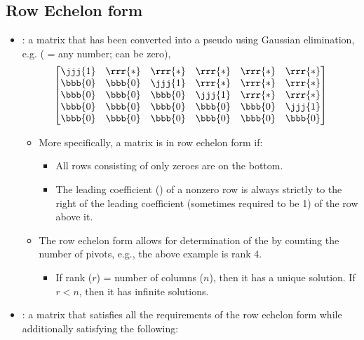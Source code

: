 \begin{itemize}
  \subsection{Row Echelon form}\label{Row Echelon form}
  \begin{itemize}
    \item {}: a matrix that has been converted into a pseudo \hyperref[Diagonal and Triagnular Matrices]{} using Gaussian elimination, e.g. (\rrr{*} = any number; can be zero),
    \[%
    \begin{bmatrix}
      \jjj{1} & \rrr{*} & \rrr{*} & \rrr{*} & \rrr{*} & \rrr{*} \\
      \bbb{0} & \bbb{0} & \jjj{1} & \rrr{*} & \rrr{*} & \rrr{*} \\
      \bbb{0} & \bbb{0} & \bbb{0} & \jjj{1} & \rrr{*} & \rrr{*} \\
      \bbb{0} & \bbb{0} & \bbb{0} & \bbb{0} & \bbb{0} & \jjj{1} \\
      \bbb{0} & \bbb{0} & \bbb{0} & \bbb{0} & \bbb{0} & \bbb{0} \\
    \end{bmatrix}
    \]%
    \begin{itemize}
      \item More specifically, a matrix is in row echelon form if:
      \begin{itemize}
        \item All rows consisting of only zeroes are on the bottom.
        \item The leading coefficient () of a nonzero row is always strictly to the right of the leading coefficient (sometimes required to be 1) of the row above it. 
      \end{itemize}
      \item The row echelon form allows for determination of the \hyperref[Matrix Rank]{} by counting the number of pivots, e.g., the above example is rank 4.
        \begin{itemize}
          \item If rank (\(r\)) =  number of columns (\(n\)), then it has a unique solution. If \(r < n\), then it has infinite solutions.
        \end{itemize}
    \end{itemize}
    \item {} : a matrix that satisfies all the requirements of the row echelon form while additionally satisfying the following:

\end{itemize}
\end{itemize}
